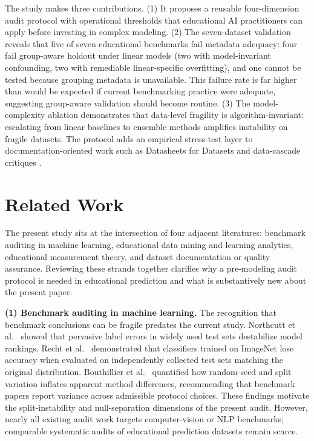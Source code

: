 The study makes three contributions. (1) It proposes a reusable four-dimension audit protocol with operational thresholds that educational AI practitioners can apply before investing in complex modeling. (2) The seven-dataset validation reveals that five of seven educational benchmarks fail metadata adequacy: four fail group-aware holdout under linear models (two with model-invariant confounding, two with remediable linear-specific overfitting), and one cannot be tested because grouping metadata is unavailable. This failure rate is far higher than would be expected if current benchmarking practice were adequate, suggesting group-aware validation should become routine. (3) The model-complexity ablation demonstrates that data-level fragility is algorithm-invariant: escalating from linear baselines to ensemble methods amplifies instability on fragile datasets. The protocol adds an empirical stress-test layer to documentation-oriented work such as Datasheets for Datasets \citep{Gebru2021} and data-cascade critiques \citep{Sambasivan2021}.

\section{Related Work}

The present study sits at the intersection of four adjacent literatures: benchmark auditing in machine learning, educational data mining and learning analytics, educational measurement theory, and dataset documentation or quality assurance. Reviewing these strands together clarifies why a pre-modeling audit protocol is needed in educational prediction and what is substantively new about the present paper.

\textbf{(1) Benchmark auditing in machine learning.} The recognition that benchmark conclusions can be fragile predates the current study. Northcutt et al.~\citep{Northcutt2021} showed that pervasive label errors in widely used test sets destabilize model rankings. Recht et al.~\citep{Recht2019} demonstrated that classifiers trained on ImageNet lose accuracy when evaluated on independently collected test sets matching the original distribution. Bouthillier et al.~\citep{Bouthillier2021} quantified how random-seed and split variation inflates apparent method differences, recommending that benchmark papers report variance across admissible protocol choices. These findings motivate the split-instability and null-separation dimensions of the present audit. However, nearly all existing audit work targets computer-vision or NLP benchmarks; comparable systematic audits of educational prediction datasets remain scarce.

